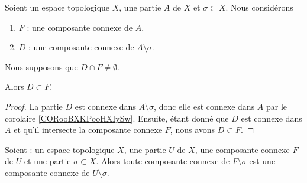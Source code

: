 \begin{proposition}	\label{PROPooQCSPooIpdXPl}
	Soient un espace topologique \( X\), une partie \( A\) de \( X\) et \( \sigma\subset X\). Nous considérons
	\begin{enumerate}
		\item
		      \( F\) : une composante connexe de \( A\),
		\item
		      \( D\) : une composante connexe de \( A\setminus \sigma\).
	\end{enumerate}
	Nous supposons que \( D\cap F\neq \emptyset\).

	Alors \( D\subset F\).
\end{proposition}

\begin{proof}
	La partie \( D\) est connexe dans \( A\setminus \sigma\), donc elle est connexe dans \( A\) par le corolaire \ref{CORooBXKPooHXIySw}. Ensuite, étant donné que \( D\) est connexe dans \( A\) et qu'il intersecte la composante connexe \( F\), nous avons \( D\subset F\).
\end{proof}

\begin{proposition}	\label{PROPooIEHFooTtqdrw}
	Soient : un espace topologique \( X\), une partie \( U\) de \( X\), une composante connexe \( F\) de \( U\) et une partie \( \sigma\subset X\). Alors toute composante connexe de \( F\setminus\sigma\) est une composante connexe de \( U\setminus \sigma\).
\end{proposition}

